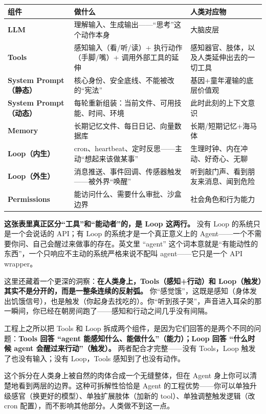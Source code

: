 \documentclass[11pt,a4paper]{ctexart}
\begin{document}
\begin{center}

\begin{tabularx}{\textwidth}{lXX}
\toprule
组件 & 做什么 & 人类对应物 \\
\midrule
\textbf{LLM} & 理解输入、生成输出——“思考”这个动作本身 & 大脑皮层 \\
\textbf{Tools} & 感知输入（看/听/读）+ 执行动作（手脚/嘴）+ 调用外部工具的延伸 & 感知器官、肢体，以及人类延伸出去的一切工具 \\
\textbf{System Prompt（静态）} & 核心身份、安全底线、不能被改的“宪法” & 基因+童年灌输的底层价值观 \\
\textbf{System Prompt（动态）} & 每轮重新组装：当前文件、可用技能、时间、环境 & 此时此刻的上下文意识 \\
\textbf{Memory} & 长期记忆文件、每日日记、向量数据库 & 长期/短期记忆+海马体 \\
\textbf{Loop（内生）} & cron、heartbeat、定时反思——主动“想起来该做某事” & 生理时钟、内在冲动、好奇心、无聊 \\
\textbf{Loop（外生）} & 消息推送、事件回调、传感器触发——被外界“唤醒” & 听到敲门声、看到朋友来消息、闻到危险 \\
\textbf{Permissions} & 能访问什么、需要什么审批、沙盒边界 & 社会角色和行为能力 \\
\bottomrule
\end{tabularx}
\end{center}

\textbf{这张表里真正区分“工具”和“能动者”的，是 Loop 这两行。} 没有 Loop 的系统只是一个会说话的 API；有 Loop 的系统才是一个真正意义上的 Agent——一个不需要你问、自己会醒过来做事的存在。英文里 “agent” 这个词本意就是“有能动性的东西”，一个只响应不主动的系统严格来说不配叫 agent——它只是一个 API wrapper。

这里还藏着一个更深的洞察：\textbf{在人类身上，Tools（感知+行动）和 Loop（触发）其实不是分开的，而是一整条连续的反射弧。} 你“感觉饿”，这既是感知（身体发出饥饿信号），也是触发（你起身去找吃的）。你“听到孩子哭”，声音进入耳朵的那一瞬间，你已经在朝房间跑了——感知和行动之间几乎没有间隔。

工程上之所以把 Tools 和 Loop 拆成两个组件，是因为它们回答的是两个不同的问题：\textbf{Tools 回答 “agent 能感知什么、能做什么”（能力）；Loop 回答 “什么时候 agent 会醒过来行动”（触发）。} 两者配合才完整——没有 Tools，Loop 触发了也没有输入；没有 Loop，Tools 感知到了也没有动作。

这个拆分在人类身上被自然的肉体合成一个无缝整体，但在 Agent 身上你可以清楚地看到两层的边界。这种可拆解性恰恰是 Agent 的工程优势——你可以单独升级感官（换更好的模型）、单独扩展肢体（加新的 tool）、单独调整触发逻辑（改 cron 配置），而不影响其他部分。人类做不到这一点。
\end{document}

